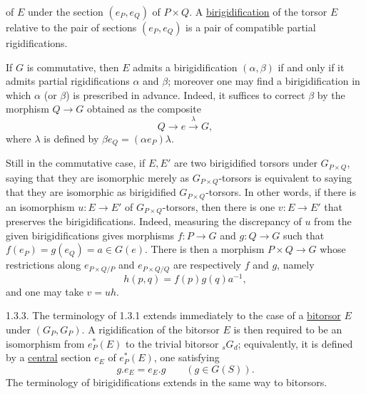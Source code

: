 
of $E$ under the section $(e_P,e_Q)$ of $P\times Q$. A
\underline{birigidification} of the torsor $E$ relative to the pair of
sections $(e_P,e_Q)$ is a pair of compatible partial rigidifications.

If $G$ is commutative, then $E$ admits a birigidification
$(\alpha,\beta)$ if and only if it admits partial rigidifications
$\alpha$ and $\beta$; moreover one may find a birigidification in which
$\alpha$ (or $\beta$) is prescribed in advance. Indeed, it suffices to
correct $\beta$ by the morphism $Q\longrightarrow G$ obtained as the
composite
\[
 Q\longrightarrow e\xrightarrow{\lambda}G,
\]
where $\lambda$ is defined by
$\beta e_Q=(\alpha e_P)\lambda$.

Still in the commutative case, if $E,E'$ are two birigidified torsors
under $G_{P\times Q}$, saying that they are isomorphic merely as
$G_{P\times Q}$-torsors is equivalent to saying that they are
isomorphic as birigidified $G_{P\times Q}$-torsors. In other words, if
there is an isomorphism $u:E\longrightarrow E'$ of
$G_{P\times Q}$-torsors, then there is one
$v:E\longrightarrow E'$ that preserves the birigidifications. Indeed,
measuring the discrepancy of $u$ from the given birigidifications gives
morphisms $f:P\longrightarrow G$ and $g:Q\longrightarrow G$ such that
$f(e_P)=g(e_Q)=a\in G(e)$. There is then a morphism
$P\times Q\longrightarrow G$ whose restrictions along
$e_{P\times Q/P}$ and $e_{P\times Q/Q}$ are respectively $f$ and $g$,
namely
\[
 h(p,q)=f(p)g(q)a^{-1},
\]
and one may take $v=uh$.

1.3.3. The terminology of 1.3.1 extends immediately to the case of a
\underline{bitorsor} $E$ under $(G_P,G_P)$. A rigidification of the
bitorsor $E$ is then required to be an isomorphism from $e_P^*(E)$ to
the trivial bitorsor ${}_sG_d$; equivalently, it is defined by a
\underline{central} section $e_E$ of $e_P^*(E)$, one satisfying
\[
 g.e_E=e_E.g\qquad(g\in G(S)).
\]
The terminology of birigidifications extends in the same way to
bitorsors.

